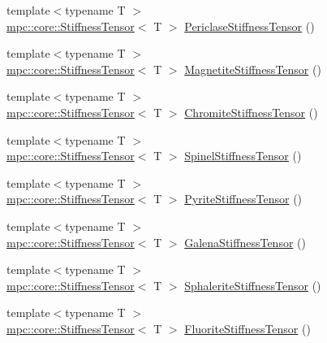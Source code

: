 \begin{DoxyCompactItemize}
\item 
{\footnotesize template$<$typename T $>$ }\\\mbox{\hyperlink{structmpc_1_1core_1_1_stiffness_tensor}{mpc\+::core\+::\+Stiffness\+Tensor}}$<$ T $>$ \mbox{\hyperlink{namespacempc_1_1data_a123f3e6d4956f31c293ae67908eed716}{Periclase\+Stiffness\+Tensor}} ()
\item 
{\footnotesize template$<$typename T $>$ }\\\mbox{\hyperlink{structmpc_1_1core_1_1_stiffness_tensor}{mpc\+::core\+::\+Stiffness\+Tensor}}$<$ T $>$ \mbox{\hyperlink{namespacempc_1_1data_a828c1129601d11df8b7011f0423b1aab}{Magnetite\+Stiffness\+Tensor}} ()
\item 
{\footnotesize template$<$typename T $>$ }\\\mbox{\hyperlink{structmpc_1_1core_1_1_stiffness_tensor}{mpc\+::core\+::\+Stiffness\+Tensor}}$<$ T $>$ \mbox{\hyperlink{namespacempc_1_1data_a64227191a094294f3fcf307925258334}{Chromite\+Stiffness\+Tensor}} ()
\item 
{\footnotesize template$<$typename T $>$ }\\\mbox{\hyperlink{structmpc_1_1core_1_1_stiffness_tensor}{mpc\+::core\+::\+Stiffness\+Tensor}}$<$ T $>$ \mbox{\hyperlink{namespacempc_1_1data_ac060daa7aa19b1d60f0831f6173589bb}{Spinel\+Stiffness\+Tensor}} ()
\item 
{\footnotesize template$<$typename T $>$ }\\\mbox{\hyperlink{structmpc_1_1core_1_1_stiffness_tensor}{mpc\+::core\+::\+Stiffness\+Tensor}}$<$ T $>$ \mbox{\hyperlink{namespacempc_1_1data_ac0c01cf5a1a454b325b77d7a14925409}{Pyrite\+Stiffness\+Tensor}} ()
\item 
{\footnotesize template$<$typename T $>$ }\\\mbox{\hyperlink{structmpc_1_1core_1_1_stiffness_tensor}{mpc\+::core\+::\+Stiffness\+Tensor}}$<$ T $>$ \mbox{\hyperlink{namespacempc_1_1data_ae7eeb0183f6f910c6a85d453d995d519}{Galena\+Stiffness\+Tensor}} ()
\item 
{\footnotesize template$<$typename T $>$ }\\\mbox{\hyperlink{structmpc_1_1core_1_1_stiffness_tensor}{mpc\+::core\+::\+Stiffness\+Tensor}}$<$ T $>$ \mbox{\hyperlink{namespacempc_1_1data_a032efffe1239af48e9d16ea2acbfd88b}{Sphalerite\+Stiffness\+Tensor}} ()
\item 
{\footnotesize template$<$typename T $>$ }\\\mbox{\hyperlink{structmpc_1_1core_1_1_stiffness_tensor}{mpc\+::core\+::\+Stiffness\+Tensor}}$<$ T $>$ \mbox{\hyperlink{namespacempc_1_1data_ab1ea872183bafecc882ff55086295f85}{Fluorite\+Stiffness\+Tensor}} ()

\end{DoxyCompactItemize}
